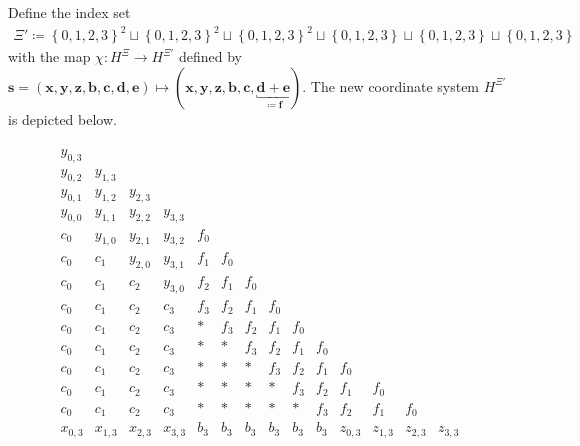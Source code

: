 \begin{definition}
    Define the index set 
    \begin{align*}
        \Xi' \coloneqq \left\{ 0,1,2,3 \right\}^2 \sqcup \left\{ 0,1,2,3 \right\}^2 \sqcup \left\{ 0,1,2,3 \right\}^2 \sqcup \left\{ 0,1,2,3 \right\} \sqcup \left\{ 0,1,2,3 \right\} \sqcup \left\{ 0,1,2,3 \right\} 
    \end{align*}
    with the map \( \chi: H^\Xi \to H^{\Xi'}\) defined by \(  \mathbf{s} = (\mathbf{x}, \mathbf{y}, \mathbf{z}, \mathbf{b}, \mathbf{c}, \mathbf{d}, \mathbf{e}) \mapsto (\mathbf{x}, \mathbf{y}, \mathbf{z}, \mathbf{b}, \mathbf{c}, \underbracket{\mathbf{d} + \mathbf{e}}_{\coloneqq \mathbf{f}}) \).
    The new coordinate system \( H^{\Xi'} \) is depicted below.

\begin{figure}[H]
    \begin{align*}
        \begin{array}{cccccccccccccccccccc}
            y_{0,3} & & & & & & & & & & & & \\
            y_{0,2} & y_{1,3} & & & & & & & & & & & \\
            y_{0,1} & y_{1,2} & y_{2,3} & & & & & & & & & & \\
            y_{0,0} & y_{1,1} & y_{2,2} & y_{3,3} & & & & & & & & & \\
            c_0 & y_{1,0} & y_{2,1} & y_{3,2} & f_0 & & & & & & & & \\
            c_0 & c_1 & y_{2,0} & y_{3,1} & f_1 & f_0 & & & & & & & \\
            c_0 & c_1 & c_2 & y_{3,0} & f_2 & f_1 & f_0 & & & & & & \\
            c_0 & c_1 & c_2 & c_3 & f_3 & f_2 & f_1 & f_0 & & & & & \\
            c_0 & c_1 & c_2 & c_3 &  *  & f_3 & f_2 & f_1 & f_0 & & & & \\
            c_0 & c_1 & c_2 & c_3 &  *  & * & f_3 & f_2 & f_1 & f_0 & & & \\
            c_0 & c_1 & c_2 & c_3 &  *  & * & * & f_3 & f_2 & f_1 & f_0 & & \\
            c_0 & c_1 & c_2 & c_3 &  *  & * & * & * & f_3 & f_2 & f_1 & f_0 & \\
            c_0 & c_1 & c_2 & c_3 &  *  & * & * & * & * & f_3 & f_2 & f_1 & f_0 \\
            x_{0,3} & x_{1,3} & x_{2,3} & x_{3,3} & b_3 & b_3 & b_3 & b_3 & b_3 & b_3 & z_{0,3} & z_{1,3} & z_{2,3} & z_{3,3} \\

\end{array}
\end{align*}
\end{figure}
\end{definition}
